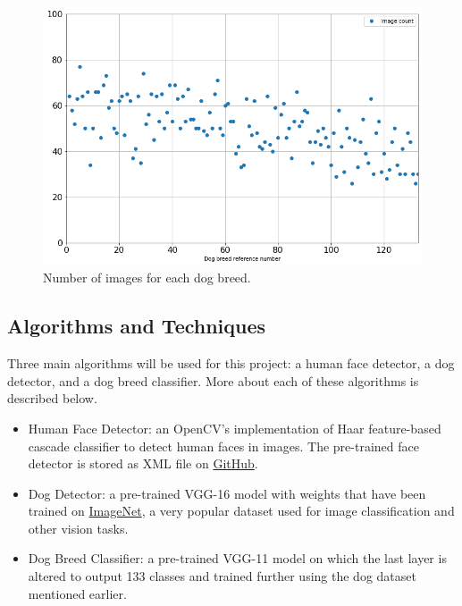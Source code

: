 \documentclass{article}
\begin{document}
    \begin{figure}[htbp]
        \centering
        \includegraphics[width=\linewidth]{img/image_count.png}
        \caption{Number of images for each dog breed.}
        \label{fig:image_count}
    \end{figure}
    
    \subsection{Algorithms and Techniques}
    
    Three main algorithms will be used for this project: a human face detector, a dog detector, and a dog breed classifier. More about each of these algorithms is described below.
    
    \begin{itemize}
        \item Human Face Detector: an OpenCV's implementation of Haar feature-based cascade classifier to detect human faces in images. The pre-trained face detector is stored as XML file on \href{https://github.com/opencv/opencv/tree/master/data/haarcascades}{GitHub}.
        
        \item Dog Detector: a pre-trained VGG-16 model with weights that have been trained on \href{https://image-net.org/}{ImageNet}, a very popular dataset used for image classification and other vision tasks.
        
        \item Dog Breed Classifier: a pre-trained VGG-11 model on which the last layer is altered to output 133 classes and trained further using the dog dataset mentioned earlier.
    \end{itemize}
    
\end{document}
